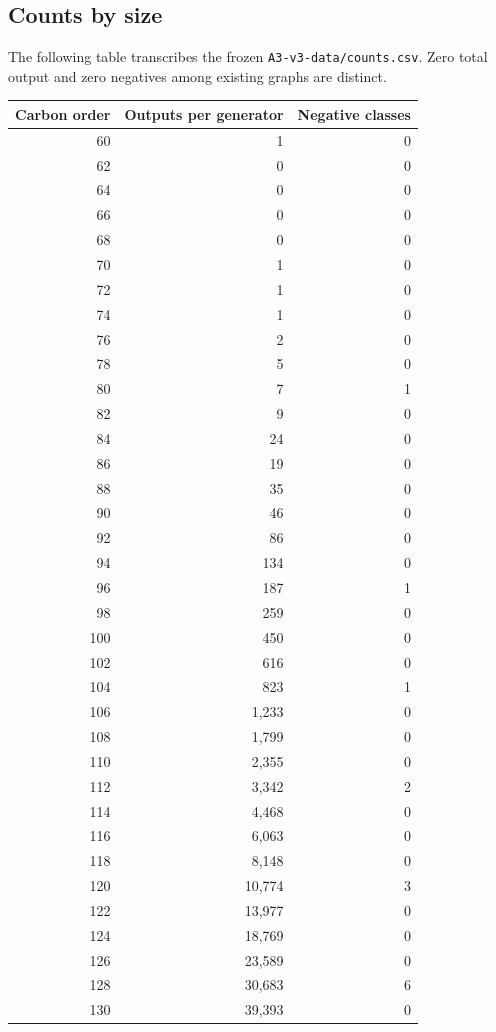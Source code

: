 \documentclass[11pt]{amsart}
\newcommand{\record}[1]{\nolinkurl{#1}}
\begin{document}
\subsection{Counts by size}
The following table transcribes the frozen \record{A3-v3-data/counts.csv}.
Zero total output and zero negatives among existing graphs are distinct.
\begin{longtable}{rrr}
\toprule Carbon order & Outputs per generator & Negative classes\\\midrule\endhead
60 & 1 & 0 \\
62 & 0 & 0 \\
64 & 0 & 0 \\
66 & 0 & 0 \\
68 & 0 & 0 \\
70 & 1 & 0 \\
72 & 1 & 0 \\
74 & 1 & 0 \\
76 & 2 & 0 \\
78 & 5 & 0 \\
80 & 7 & 1 \\
82 & 9 & 0 \\
84 & 24 & 0 \\
86 & 19 & 0 \\
88 & 35 & 0 \\
90 & 46 & 0 \\
92 & 86 & 0 \\
94 & 134 & 0 \\
96 & 187 & 1 \\
98 & 259 & 0 \\
100 & 450 & 0 \\
102 & 616 & 0 \\
104 & 823 & 1 \\
106 & 1,233 & 0 \\
108 & 1,799 & 0 \\
110 & 2,355 & 0 \\
112 & 3,342 & 2 \\
114 & 4,468 & 0 \\
116 & 6,063 & 0 \\
118 & 8,148 & 0 \\
120 & 10,774 & 3 \\
122 & 13,977 & 0 \\
124 & 18,769 & 0 \\
126 & 23,589 & 0 \\
128 & 30,683 & 6 \\
130 & 39,393 & 0 \\

\end{longtable}
\end{document}
